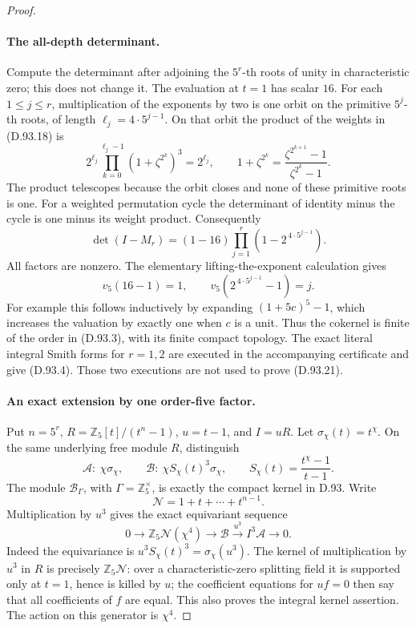 \begin{proof}
\paragraph{The all-depth determinant.}
Compute the determinant after adjoining the \(5^r\)-th roots
of unity in characteristic zero; this does not change it.
The evaluation at \(t=1\) has scalar \(16\).
For each \(1\le j\le r\), multiplication of the exponents by
two is one orbit on the primitive \(5^j\)-th roots, of length
\(\ell_j=4\cdot5^{j-1}\). On that orbit the product of the
weights in (D.93.18) is
\[
 2^{\ell_j}\prod_{k=0}^{\ell_j-1}
       (1+\zeta^{2^k})^3
 =2^{\ell_j},
 \qquad
 1+\zeta^{2^k}
     =\frac{\zeta^{2^{k+1}}-1}{\zeta^{2^k}-1}.          \tag{D.93.20}
\]
The product telescopes because the orbit closes and none
of these primitive roots is one. For a weighted permutation
cycle the determinant of identity minus the cycle is one
minus its weight product. Consequently
\[
 \det(I-M_r)
      =(1-16)\prod_{j=1}^r
                 (1-2^{\,4\cdot5^{j-1}}).             \tag{D.93.21}
\]
All factors are nonzero. The elementary lifting-the-exponent
calculation gives
\[
 v_5(16-1)=1,\qquad
 v_5(2^{\,4\cdot5^{j-1}}-1)=j.
 \]
For example this follows inductively by expanding
\((1+5c)^5-1\), which increases the valuation by exactly
one when \(c\) is a unit. Thus the cokernel is finite of the
order in (D.93.3), with its finite compact topology.
The exact literal integral Smith forms for \(r=1,2\) are
executed in the accompanying certificate and give (D.93.4).
Those two executions are not used to prove (D.93.21).

\paragraph{An exact extension by one order-five factor.}
Put \(n=5^r\), \(R=\mathbb Z_5[t]/(t^n-1)\), \(u=t-1\),
and \(I=uR\). Let \(\sigma_\chi(t)=t^\chi\).
On the same underlying free module \(R\), distinguish
\[
 \mathscr A:\ \chi\sigma_\chi,\qquad
 \mathscr B:\ \chi S_\chi(t)^3\sigma_\chi,
       \qquad S_\chi(t)=\frac{t^\chi-1}{t-1}.
\]
The module \(\mathscr B_\Gamma\), with
\(\Gamma=\mathbb Z_5^\times\), is exactly the compact kernel
in D.93. Write
\[
                  \mathcal N=1+t+\cdots+t^{n-1}.
\]
Multiplication by \(u^3\) gives the exact equivariant sequence
\[
 0\longrightarrow \mathbb Z_5\mathcal N(\chi^4)
   \longrightarrow \mathscr B
   \xrightarrow{u^3} I^3\mathscr A
   \longrightarrow0.                                \tag{D.93.22}
\]
Indeed the equivariance is
\(u^3 S_\chi(t)^3=\sigma_\chi(u^3)\).
The kernel of multiplication by \(u^3\) in \(R\) is precisely
\(\mathbb Z_5\mathcal N\): over a characteristic-zero splitting
field it is supported only at \(t=1\), hence is killed by \(u\);
the coefficient equations for \(u f=0\) then say that all
coefficients of \(f\) are equal. This also proves the integral
kernel assertion. The action on this generator is \(\chi^4\).


\end{proof}
